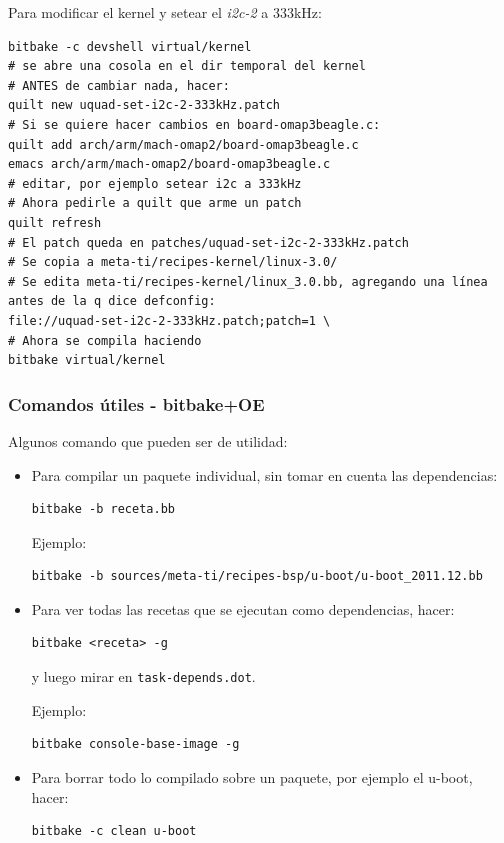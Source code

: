 \documentclass[main]{subfiles}
\begin{document}
Para modificar el kernel y setear el \textit{i2c-2} a 333kHz:

\begin{verbatim}
bitbake -c devshell virtual/kernel
# se abre una cosola en el dir temporal del kernel
# ANTES de cambiar nada, hacer:
quilt new uquad-set-i2c-2-333kHz.patch
# Si se quiere hacer cambios en board-omap3beagle.c:
quilt add arch/arm/mach-omap2/board-omap3beagle.c
emacs arch/arm/mach-omap2/board-omap3beagle.c
# editar, por ejemplo setear i2c a 333kHz
# Ahora pedirle a quilt que arme un patch
quilt refresh
# El patch queda en patches/uquad-set-i2c-2-333kHz.patch
# Se copia a meta-ti/recipes-kernel/linux-3.0/
# Se edita meta-ti/recipes-kernel/linux_3.0.bb, agregando una línea antes de la q dice defconfig:
file://uquad-set-i2c-2-333kHz.patch;patch=1 \
# Ahora se compila haciendo
bitbake virtual/kernel
\end{verbatim}

\subsubsection{Comandos útiles - bitbake+OE}
\label{sec:codigo:comandos-bitbake-oe}

Algunos comando que pueden ser de utilidad:

\begin{itemize}
\item Para compilar un paquete individual, sin tomar en cuenta las dependencias:
\begin{verbatim}
bitbake -b receta.bb
\end{verbatim}
Ejemplo:
\begin{verbatim}
bitbake -b sources/meta-ti/recipes-bsp/u-boot/u-boot_2011.12.bb
\end{verbatim}
\item Para ver todas las recetas que se ejecutan como dependencias, hacer:
\begin{verbatim}
bitbake <receta> -g
\end{verbatim}
y luego mirar en \verb+task-depends.dot+.

Ejemplo:
\begin{verbatim}
bitbake console-base-image -g
\end{verbatim}
\item Para borrar todo lo compilado sobre un paquete, por ejemplo el u-boot, hacer:
\begin{verbatim}
bitbake -c clean u-boot
\end{verbatim}
\end{itemize}
\end{document}
